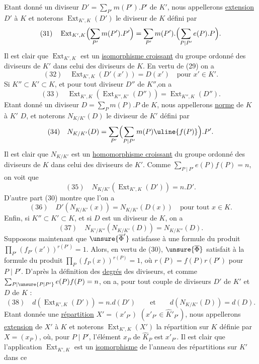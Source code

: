Etant donné un diviseur $D'=\sum_{P'}m(P').P'$ de $K'$, nous appellerons \uline{extension} 
$D'$ à $K$ et noterons $\operatorname{Ext}_{K',K}(D')$ le diviseur de $K$ défini par
\[
(31)\quad\operatorname{Ext}_{K',K}\Bigl(\sum_{P'}m(P').P'\Bigr)
=\sum_{P'}m(P').\Bigl(\sum_{P\mid P'}e(P).P\Bigr).
\]
Il est clair que $\operatorname{Ext}_{K',K}$ est un \uline{isomorphisme croissant} du groupe
 ordonné des diviseurs de $K'$ dans celui des diviseurs de $K$.
En vertu de (29) on a
\[
(32)\quad\operatorname{Ext}_{K',K}(D'(x'))=D(x')\quad\text{pour }x'\in K'.
\]
Si $K''\subset K'\subset K$, et pour tout diviseur $D''$ de $K''$,on a
\[
(33)\quad\operatorname{Ext}_{K',K}(\operatorname{Ext}_{K'',K'}(D''))
=\operatorname{Ext}_{K'',K}(D'').
\]
Etant donné un diviseur $D=\sum_P m(P).P$ de $K$, nous appellerons \uline{norme} de $K$ à $K'$ 
$D$, et noterons $N_{K/K'}(D)$ le diviseur de $K'$ défini par
\[
(34)\quad N_{K/K'}(D)=\sum_{P'}\Bigl(\sum_{P\mid P'}m(P)\uline{f(P)}\Bigr).P'.
\]
Il est clair que $N_{K/K'}$ est un \uline{homomorphisme croissant} du groupe ordonné des diviseurs
de $K$ dans celui des diviseurs de $K'$. Comme $\sum_{P\mid P'}e(P)f(P)=n$, on voit que
\[
(35)\quad N_{K/K'}(\operatorname{Ext}_{K',K}(D'))=n.D'.
\]
D'autre part (30) montre que l'on a
\[
(36)\quad D'(N_{K/K'}(x))=N_{K/K'}(D(x))\quad\text{pour tout }x\in K.
\]
Enfin, si $K''\subset K'\subset K$, et si $D$ est un diviseur de $K$, on a
\[
(37)\quad N_{K'/K''}(N_{K/K'}(D))=N_{K/K''}(D).
\]
Supposons maintenant que $\unsure{\overline\Phi'}$ satisfasse à une formule du produit
$\prod_{P'}(f_{P'}(x'))^{r(P')}=1$.
Alors, en vertu de (30), $\unsure{\overline\Phi}$ satisfait à la formule
du produit $\prod_P(f_P(x))^{r(P)}=1$, où $r(P)=f(P)r(P')$ pour $P\mid P'$.
D'après la définition des \uline{degrés} des diviseurs, et comme
$\sum_{P\mid\unsure{P|P'}}e(P)f(P)=n$, on a, pour tout couple de diviseurs $D'$ de $K'$ et $D$ de $K$ :
\[
(38)\quad d(\operatorname{Ext}_{K',K}(D'))=n.d(D')\qquad\text{et}\qquad d(N_{K/K'}(D))=d(D).
\]
Etant donnée une \uline{répartition} 
$X'=(x'_{P'})$ $(x'_{P'}\in\widehat K'_{P'})$, nous appellerons
\uline{extension} de $X'$ à $K$ et noterons $\operatorname{Ext}_{K',K}(X')$ la répartition sur $K$ définie par
$X=(x_P)$, où, pour $P\mid P'$, l'élément $x_P$ de $\widehat K_P$ est $x'_{P'}$.
Il est clair que l'application $\operatorname{Ext}_{K',K}$ est un \uline{isomorphisme} de l'anneau des répartitions sur $K'$ dans ce


